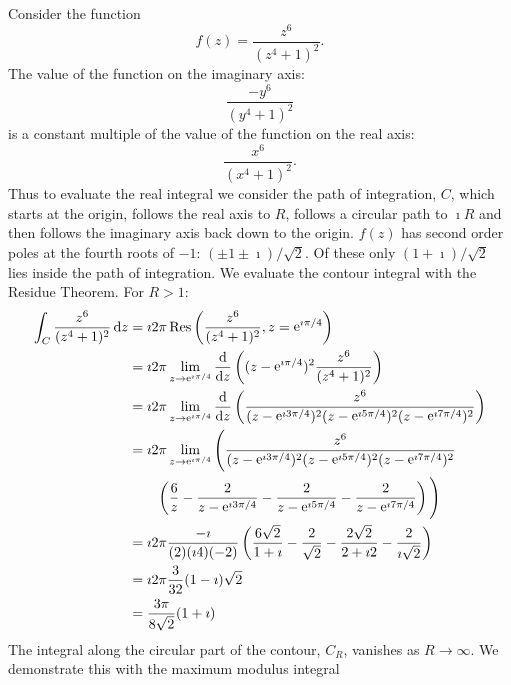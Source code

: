 {%
\begin{Solution}
  \label{solution x^6/(x^4+1)^2}
  Consider the function 
  \[
  f(z) = \frac{ z^6 }{ (z^4 + 1)^2 }.
  \]
  The value of the function on the imaginary axis:
  \[
  \frac{ -y^6 }{ (y^4 + 1)^2 }
  \]
  is a constant multiple of the value of the function on the real axis:
  \[
  \frac{ x^6 }{ (x^4 + 1)^2 }.
  \]
  Thus to evaluate the real integral we consider the path of integration, $C$,
  which starts at the origin, follows the real axis to $R$, follows a 
  circular path to $\imath R$ and then follows the imaginary axis back down to 
  the origin.  $f(z)$ has second order poles at the fourth roots of $-1$: 
  $(\pm 1 \pm \imath) / \sqrt{2}$.  Of these only $(1 + \imath) / \sqrt{2}$
  lies inside the path of integration.  We evaluate the contour integral
  with the Residue Theorem.  For $R > 1$:
  \begin{align*}
    \int_C \frac{ z^6 }{ (z^4 + 1)^2 } \,\mathrm{d} z
    &= \imath 2 \pi \mathop{\mathrm{Res}}\nolimits \left( \frac{ z^6 }{ (z^4 + 1)^2 }, z = \mathop{\mathrm{e}}\nolimits^{\imath \pi / 4}
    \right) \\
    &= \imath 2 \pi \lim_{z \to \mathop{\mathrm{e}}\nolimits^{\imath \pi / 4} } \frac{\mathrm{d}}{\mathrm{d} z} \left(
      (z - \mathop{\mathrm{e}}\nolimits^{\imath \pi / 4})^2 \frac{ z^6 } { (z^4 + 1)^2 } \right) \\
    &= \imath 2 \pi \lim_{z \to \mathop{\mathrm{e}}\nolimits^{\imath \pi / 4} } \frac{\mathrm{d}}{\mathrm{d} z} \left(
      \frac{ z^6 } { (z - \mathop{\mathrm{e}}\nolimits^{\imath 3 \pi / 4})^2
        (z - \mathop{\mathrm{e}}\nolimits^{\imath 5 \pi / 4})^2 (z - \mathop{\mathrm{e}}\nolimits^{\imath 7 \pi / 4})^2 } \right) \\
    &= \imath 2 \pi \lim_{z \to \mathop{\mathrm{e}}\nolimits^{\imath \pi / 4} } \Bigg(
    \frac{ z^6 }{ (z - \mathop{\mathrm{e}}\nolimits^{\imath 3 \pi / 4})^2
      (z - \mathop{\mathrm{e}}\nolimits^{\imath 5 \pi / 4})^2 (z - \mathop{\mathrm{e}}\nolimits^{\imath 7 \pi / 4})^2 } \\
    &\qquad \left( \frac{6}{z} - \frac{2}{z - \mathop{\mathrm{e}}\nolimits^{\imath 3 \pi / 4} }
      - \frac{2}{z - \mathop{\mathrm{e}}\nolimits^{\imath 5 \pi / 4} }
      - \frac{2}{z - \mathop{\mathrm{e}}\nolimits^{\imath 7 \pi / 4} }
    \right) \Bigg) \\
    &= \imath 2 \pi \frac{ -\imath }{ (2)(\imath 4)(-2) } \left( 
      \frac{6 \sqrt{2} }{ 1 + \imath } - \frac{ 2 }{ \sqrt{2} }
      - \frac{ 2 \sqrt{2} }{ 2 + \imath 2 } - \frac{ 2 }{ \imath \sqrt{2} }
    \right) \\
    &= \imath 2 \pi \frac{3}{32} (1 - \imath) \sqrt{2} \\
    &= \frac{3 \pi }{ 8 \sqrt{2} } (1 + \imath)
  \end{align*}
  The integral along the circular part of the contour, $C_R$, vanishes as 
  $R \to \infty$.  We demonstrate this with the maximum modulus integral 

\end{Solution}}
